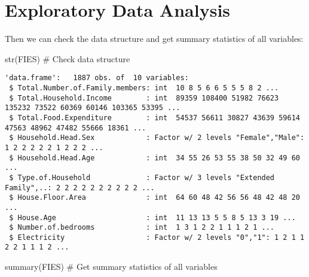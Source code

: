 \documentclass[
]{article}
\newenvironment{Shaded}{\begin{snugshade}}{\end{snugshade}}
\newcommand{\CommentTok}[1]{\textcolor[rgb]{0.37,0.37,0.37}{#1}}
\newcommand{\FunctionTok}[1]{\textcolor[rgb]{0.28,0.35,0.67}{#1}}
\newcommand{\NormalTok}[1]{\textcolor[rgb]{0.00,0.23,0.31}{#1}}
\begin{document}
\hypertarget{exploratory-data-analysis}{%
\section{Exploratory Data Analysis}\label{exploratory-data-analysis}}

Then we can check the data structure and get summary statistics of all
variables:

\begin{Shaded}
\begin{Highlighting}[]
\FunctionTok{str}\NormalTok{(FIES) }\CommentTok{\# Check data structure }
\end{Highlighting}
\end{Shaded}

\begin{verbatim}
'data.frame':   1887 obs. of  10 variables:
 $ Total.Number.of.Family.members: int  10 8 5 6 6 5 5 5 8 2 ...
 $ Total.Household.Income        : int  89359 108400 51982 76623 135232 73522 60369 60146 103365 53395 ...
 $ Total.Food.Expenditure        : int  54537 56611 30827 43639 59614 47563 48962 47482 55666 18361 ...
 $ Household.Head.Sex            : Factor w/ 2 levels "Female","Male": 1 2 2 2 2 2 1 2 2 2 ...
 $ Household.Head.Age            : int  34 55 26 53 55 38 50 32 49 60 ...
 $ Type.of.Household             : Factor w/ 3 levels "Extended Family",..: 2 2 2 2 2 2 2 2 2 2 ...
 $ House.Floor.Area              : int  64 60 48 42 56 56 48 42 48 20 ...
 $ House.Age                     : int  11 13 13 5 5 8 5 13 3 19 ...
 $ Number.of.bedrooms            : int  1 3 1 2 2 1 1 1 2 1 ...
 $ Electricity                   : Factor w/ 2 levels "0","1": 1 2 1 1 2 2 1 1 1 2 ...
\end{verbatim}

\begin{Shaded}
\begin{Highlighting}[]
\FunctionTok{summary}\NormalTok{(FIES) }\CommentTok{\# Get summary statistics of all variables  }
\end{Highlighting}
\end{Shaded}
\end{document}
